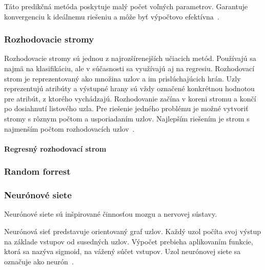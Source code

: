 \documentclass[a4paper,slovak,12pt,appendix]{article}
\begin{document}
Táto predikčná metóda poskytuje malý počet voľných parametrov. Garantuje
konvergenciu k ideálnemu riešeniu a môže byť výpočtovo
efektívna~\cite{Sapankevych2009}.


\subsubsection{Rozhodovacie stromy}
Rozhodovacie stromy sú jednou z najrozšírenejších učiacich metód. Používajú sa
najmä na klasifikáciu, ale v súčasnosti sa využívajú aj na regresiu.
Rozhodovací strom je reprezentovaný ako množina uzlov a im prislúchajúcich
hrán. Uzly reprezentujú atribúty a výstupné hrany sú vždy označené konkrétnou
hodnotou pre atribút, z ktorého vychádzajú. Rozhodovanie začína v koreni stromu
a končí po dosiahnutí listového uzla. Pre riešenie jedného problému je možné
vytvoriť stromy s rôznym počtom a usporiadaním uzlov. Najlepším riešením je
strom s najmenším počtom rozhodovacích uzlov~\cite{Merz1998}.

\paragraph{Regresný rozhodovací strom}


\subsubsection{Random forrest}


\subsubsection{Neurónové siete}
Neurónové siete sú inšpirované činnosťou mozgu a nervovej sústavy.

Neurónová sieť predstavuje orientovaný graf uzlov. Každý uzol počíta svoj
výstup na základe vstupov od susedných uzlov. Výpočet prebieha aplikovaním
funkcie, ktorá sa nazýva sigmoid, na vážený súčet vstupov. Uzol neurónovej
siete sa označuje ako neurón~\cite{Gruau1994}.
\end{document}
